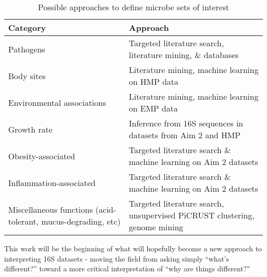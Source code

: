 \begin{table}
\begin{tabular}{|p{6cm}|p{10cm}|}
	\hline
	\textbf{Category} & \textbf{Approach} \\
	\hline
	Pathogens & Targeted literature search, literature mining, \& 
	databases \\
	\hline
	Body sites & Literature mining, machine learning on HMP data \\
	\hline
	Environmental associations & Literature mining, machine learning 
	on EMP data \\
	\hline
	Growth rate & Inference from 16S sequences in datasets from Aim 2 
	and HMP \\
	\hline
	Obesity-associated & Targeted literature search \& machine 
	learning on Aim 2 datasets \\
	\hline
	Inflammation-associated & Targeted literature search \& machine 
	learning on Aim 2 datasets \\
	\hline
	Miscellaneous functions (acid-tolerant, mucus-degrading, etc) & 
	Targeted literature search, unsupervised PiCRUST clustering, 
	genome mining \\
	\hline 
\end{tabular}
\caption{Possible approaches to define microbe sets of interest}\label{tab:microbe_set_categories}
\end{table}



This work will be the beginning of what will hopefully become a new 
approach to interpreting 16S datasets - moving the field from asking 
simply ``what's different?'' toward a more critical interpretation of 
``why are things different?''